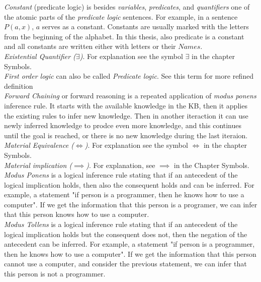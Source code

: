 \emph{Constant} (predicate logic) is besides \emph{variables}, 
\emph{predicates}, and \emph{quantifiers} one of the atomic parts of the 
\emph{predicate logic} sentences. For example, in a sentence $P(a,x)$, $a$ 
serves as a constant. Constants are usually marked with the letters from the
beginning of the alphabet. In this thesis, also predicate is a constant and
all constants are written either with letters or their $Names$.\\

\emph{Existential Quantifier ($\exists$)}. For explanation see the symbol
$\exists$ in the chapter Symbols.\\

\emph {First order logic} can also be called \emph{Predicate logic}. See this
term for more refined definition\\

\emph{Forward Chaining} or forward reasoning is a repeated application of
\emph{modus ponens} inference rule. It starts with the available knowledge in 
the KB, then it applies the existing rules to infer new knowledge. Then in
another iteraction it can use newly inferred knowledge to prodce even more 
knowledge, and this continues until the goal is reached, or there is no new
knowledge during the last iteraion.\\

\emph{Material Equivalence ($\iff$)}. For explanation see the symbol $\iff$ in the
chapter Symbols.\\

\emph{Material implication ($\implies$)}. For explanation, see $\implies$ in the
Chapter Symbols.\\

\emph{Modus Ponens} is a logical inference rule stating that if an antecedent
of the logical implication holds, then also the consequent holds and can be
inferred. For example, a statement "if person is a 
programmer, then he knows how to use a computer". If we get the information
that this person is a programer, we can infer that this person knows how to
use a computer. \\

\emph{Modus Tollens} is a logical inference rule stating that if an antecedent
of the logical implication holds but the consequent does not, then the negation
of the antecedent can be inferred. For example, a statement "if person is a 
programmer, then he knows how to use a computer". If we get the information
that this person cannot use a computer, and consider the previous statement, we
can infer that this person is not a programmer. \\

